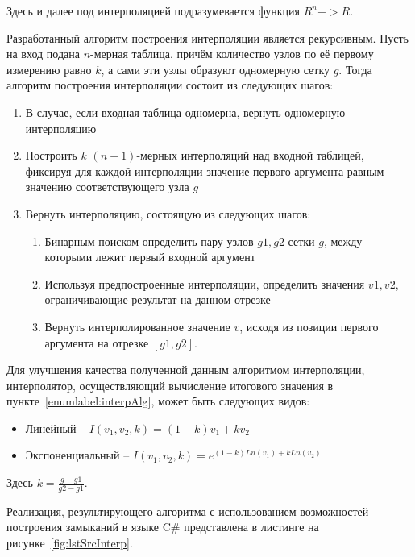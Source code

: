 Здесь и далее под интерполяцией подразумевается функция $\!R^n -> \!R$.

Разработанный алгоритм построения интерполяции является рекурсивным.
Пусть на вход подана $n$-мерная таблица, причём количество узлов по её первому 
измерению равно $k$, а сами эти узлы образуют одномерную сетку $g$.
Тогда алгоритм построения интерполяции состоит из следующих шагов:
\begin{enumerate}
    \item В случае, если входная таблица одномерна, вернуть одномерную 
    интерполяцию
    \item Построить $k$ $(n-1)$-мерных интерполяций над входной таблицей, 
    фиксируя для каждой интерполяции значение первого аргумента равным значению 
    соответствующего узла $g$
    \item Вернуть интерполяцию, состоящую из следующих шагов:
    \begin{enumerate}
        \item Бинарным поиском определить пару узлов $g1, g2$ сетки $g$, между 
        которыми лежит первый входной аргумент
        \item Используя предпостроенные интерполяции, определить значения $v1, 
        v2$, ограничивающие результат на данном отрезке
        \item Вернуть интерполированное значение $v$, исходя из позиции первого 
        аргумента на отрезке $[g1, g2]$.\label{enumlabel:interpAlg}
    \end{enumerate}
\end{enumerate}

Для улучшения качества полученной данным алгоритмом интерполяции, интерполятор, 
осуществляющий вычисление итогового значения в 
пункте~\ref{enumlabel:interpAlg}, может быть следующих видов:
\begin{itemize}
    \item Линейный -- $I(v_1, v_2, k) = (1 - k)v_1 + k v_2$
    \item Экспоненциальный -- $I(v_1, v_2, k) = e^{(1 - k)Ln(v_1) + k Ln(v_2)}$
\end{itemize}
Здесь $k = \frac{g - g1}{g2 - g1}$.

Реализация, результирующего алгоритма с использованием возможностей построения 
замыканий в языке C\# представлена в листинге на рисунке~\ref{fig:lstSrcInterp}.

